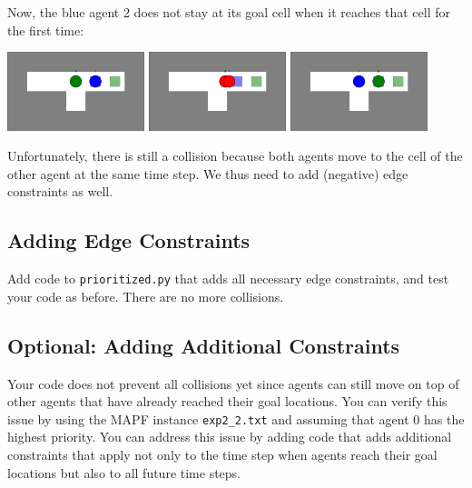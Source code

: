 \documentclass[11pt]{article}
\begin{document}
Now, the blue agent 2 does not stay at its goal cell when it reaches that cell for the first time:

\begin{center}
\includegraphics[width=0.3\textwidth]{images/exp1_seq1.png}
\hfill
\includegraphics[width=0.3\textwidth]{images/exp1_seq2.png}
\hfill
\includegraphics[width=0.3\textwidth]{images/exp1_seq3.png}
\end{center}

Unfortunately, there is still a collision because both agents move to the cell of the other agent at the same time step. We thus need to add (negative) edge constraints as well.

\subsection{Adding Edge Constraints}

Add code to \texttt{prioritized.py} that adds all necessary edge constraints, and test your code as before. There are no more collisions.

\subsection{Optional: Adding Additional Constraints \label{add}}

Your code does not prevent all collisions yet since agents can still move on top of other agents that have already reached their goal locations. You can verify this issue by using the MAPF instance \texttt{exp2\_2.txt} and assuming that agent 0 has the highest priority. 
You can address this issue by adding code that adds additional constraints that apply not only to the time step when agents reach their goal locations but also to all future time steps.
\end{document}
